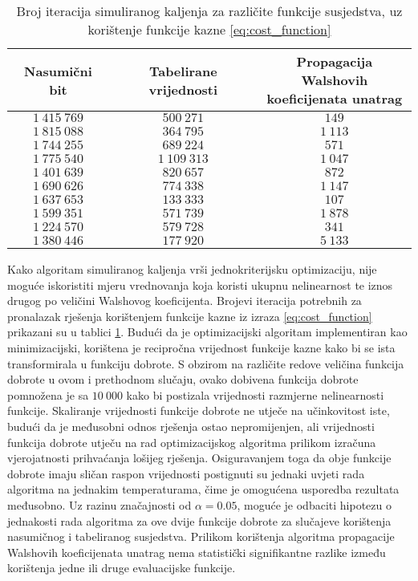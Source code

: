 \begin{table}[]
    \centering
    \begin{tabular}{ccc}
        Nasumični bit & Tabelirane vrijednosti & \makecell{Propagacija Walshovih \\ koeficijenata unatrag} \\ \hline
        $1\:415\:769$ &    $500\:271$ &    $149$ \\
        $1\:815\:088$ &    $364\:795$ & $1\:113$ \\
        $1\:744\:255$ &    $689\:224$ &    $571$ \\
        $1\:775\:540$ & $1\:109\:313$ & $1\:047$ \\
        $1\:401\:639$ &    $820\:657$ &    $872$ \\
        $1\:690\:626$ &    $774\:338$ & $1\:147$ \\
        $1\:637\:653$ &    $133\:333$ &    $107$ \\
        $1\:599\:351$ &    $571\:739$ & $1\:878$ \\
        $1\:224\:570$ &    $579\:728$ &    $341$ \\
        $1\:380\:446$ &    $177\:920$ & $5\:133$
    \end{tabular}
    \captionsetup{justification=centering}
    \caption{Broj iteracija simuliranog kaljenja za različite funkcije susjedstva, uz korištenje funkcije kazne \eqref{eq:cost_function}}
    \label{tbl:simaneal_6_walshe}
\end{table}
Kako algoritam simuliranog kaljenja vrši jednokriterijsku optimizaciju, nije moguće iskoristiti mjeru vrednovanja koja koristi ukupnu nelinearnost te iznos drugog po veličini Walshovog koeficijenta.
Brojevi iteracija potrebnih za pronalazak rješenja korištenjem funkcije kazne iz izraza \eqref{eq:cost_function} prikazani su u tablici \ref{tbl:simaneal_6_walshe}.
Budući da je optimizacijski algoritam implementiran kao minimizacijski, korištena je recipročna vrijednost funkcije kazne kako bi se ista transformirala u funkciju dobrote.
S obzirom na različite redove veličina funkcija dobrote u ovom i prethodnom slučaju, ovako dobivena funkcija dobrote pomnožena je sa $10\:000$ kako bi postizala vrijednosti razmjerne nelinearnosti funkcije.
Skaliranje vrijednosti funkcije dobrote ne utječe na učinkovitost iste, budući da je međusobni odnos rješenja ostao nepromijenjen, ali vrijednosti funkcija dobrote utječu na rad optimizacijskog algoritma prilikom izračuna vjerojatnosti prihvaćanja lošijeg rješenja.
Osiguravanjem toga da obje funkcije dobrote imaju sličan raspon vrijednosti postignuti su jednaki uvjeti rada algoritma na jednakim temperaturama, čime je omogućena usporedba rezultata međusobno.
Uz razinu značajnosti od $\alpha = 0.05$, moguće je odbaciti hipotezu o jednakosti rada algoritma za ove dvije funkcije dobrote za slučajeve korištenja nasumičnog i tabeliranog susjedstva.
Prilikom korištenja algoritma propagacije Walshovih koeficijenata unatrag nema statistički signifikantne razlike između korištenja jedne ili druge evaluacijske funkcije.

